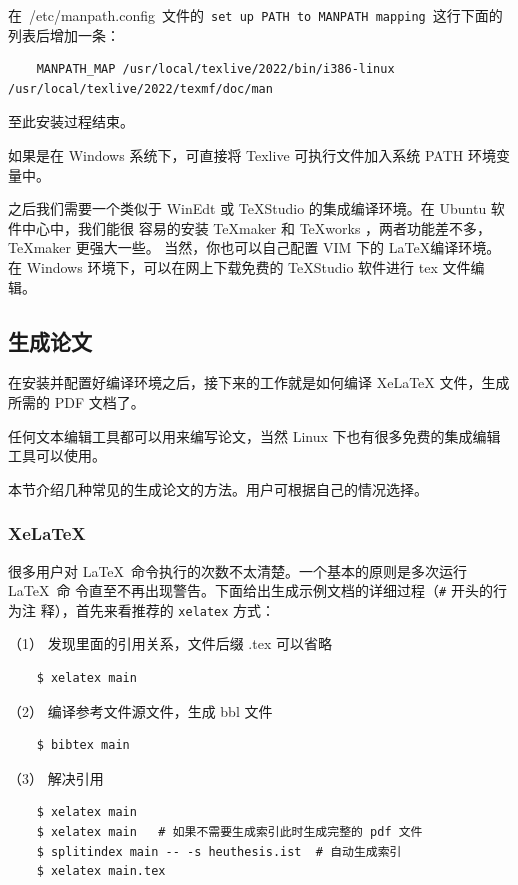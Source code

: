 在~{/etc/manpath.config}~文件的~\texttt{set up PATH to  MANPATH mapping}~这行下面的列表后增加一条：

\begin{lstlisting}
    MANPATH_MAP /usr/local/texlive/2022/bin/i386-linux /usr/local/texlive/2022/texmf/doc/man
\end{lstlisting}

至此安装过程结束。

如果是在 Windows 系统下，可直接将 Texlive 可执行文件加入系统 PATH 环境变量中。

之后我们需要一个类似于 WinEdt 或 TeXStudio 的集成编译环境。在 Ubuntu 软件中心中，我们能很
容易的安装 \TeX{}maker 和 \TeX{}works ，两者功能差不多， \TeX{}maker 更强大一些。
当然，你也可以自己配置 VIM 下的 \LaTeX{}编译环境。在 Windows 环境下，可以在网上下载免费的
TeXStudio 软件进行 tex 文件编辑。

\subsection{生成论文}

在安装并配置好编译环境之后，接下来的工作就是如何编译 Xe\LaTeX{} 文件，生成
所需的 PDF 文档了。

任何文本编辑工具都可以用来编写论文，当然 Linux 下也有很多免费的集成编辑工具可以使用。

本节介绍几种常见的生成论文的方法。用户可根据自己的情况选择。

\subsubsection{XeLaTeX}

很多用户对 \LaTeX\ 命令执行的次数不太清楚。一个基本的原则是多次运行 \LaTeX\ 命
令直至不再出现警告。下面给出生成示例文档的详细过程（\texttt{\#} 开头的行为注
释），首先来看推荐的 \texttt{xelatex} 方式：

（1） 发现里面的引用关系，文件后缀 .tex 可以省略

\begin{lstlisting}
    $ xelatex main
\end{lstlisting}

（2） 编译参考文件源文件，生成 bbl 文件

\begin{lstlisting}
    $ bibtex main
\end{lstlisting}

（3） 解决引用

\begin{lstlisting}
    $ xelatex main
    $ xelatex main   # 如果不需要生成索引此时生成完整的 pdf 文件
    $ splitindex main -- -s heuthesis.ist  # 自动生成索引
    $ xelatex main.tex
\end{lstlisting}

